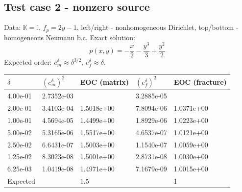 \documentclass{llncs}
\def\tn#1{{\mathbb{#1}}}    %
\begin{document}
% 



\subsection{Test case 2 - nonzero source}

Data: $\tn K=\tn I$, $f_p=2y-1$, left/right - nonhomogeneous Dirichlet, top/bottom - homogeneous Neumann b.c.
Exact solution:
\[ p(x,y) = -\frac{x}2 - \frac{y^3}3 + \frac{y^2}2 \]
Expected order: $e_m^\delta\approx\delta^{3/2}$, $e_f^\delta\approx\delta$.

\begin{tabular}{|l|ll|ll|}
\hline
$\delta$ & $(e_m^\delta)^2$ & EOC (matrix) & $(e_f^\delta)^2$ & EOC (fracture)\\
\hline
4.00e-01 & 2.7352e-03 &            & 3.2885e-05 &           \\
2.00e-01 & 3.4103e-04 & 1.5018e+00 & 7.8094e-06 & 1.0371e+00\\
1.00e-01 & 4.5694e-05 & 1.4499e+00 & 1.8929e-06 & 1.0223e+00\\
5.00e-02 & 5.3165e-06 & 1.5517e+00 & 4.6537e-07 & 1.0121e+00\\
2.50e-02 & 6.6431e-07 & 1.5003e+00 & 1.1540e-07 & 1.0059e+00\\
1.25e-02 & 8.3023e-08 & 1.5001e+00 & 2.8731e-08 & 1.0030e+00\\
6.25e-03 & 1.0419e-08 & 1.4971e+00 & 7.1679e-09 & 1.0015e+00\\
\hline
Expected & & 1.5 & & 1\\
\hline
\end{tabular}
\end{document}

